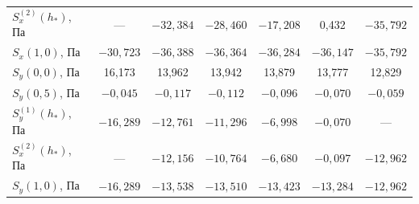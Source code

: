 \begin{table}[b!]
\begin{tabular}{l|c|c|c|c|c|c}
$S_x^{(2)}(h_*)$, Па & --- & $-32,384$ & $-28,460$ & $-17,208$ & 0,432 & $-35,792$\\


$S_x(1,0)$, Па & $-30,723$ & $-36,388$ & $-36,364$ & $-36,284$ & $-36,147$ & $-35,792$\\

%

$S_y(0,0)$, Па & 16,173 & 13,962 & 13,942 & 13,879 & 13,777 & 12,829\\

%

$S_y(0,5)$, Па & $-0,045$ & $-0,117$ & $-0,112$ & $-0,096$ & $-0,070$ & $-0,059$\\

%

$S_y^{(1)}(h_*)$, Па & $-16,289$ & $-12,761$ & $-11,296$ & $-6,998$ & $-0,070$ & ---\\



$S_x^{(2)}(h_*)$, Па &  ---       & $-12,156$ & $-10,764$ & $-6,680$ & $-0,097$ & $-12,962$\\

%

$S_y(1,0)$, Па & $-16,289$ & $-13,538$ & $-13,510$ & $-13,423$ & $-13,284$ & $-12,962$\\

\hline

\end{tabular}

\end{table}




